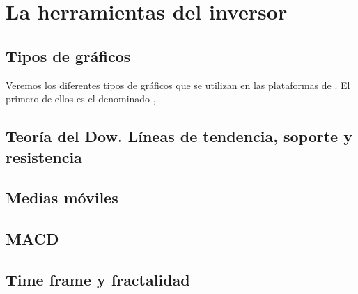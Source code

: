 \chapter{La herramientas del inversor}

\section{Tipos de gráficos}


Veremos los diferentes tipos de gráficos que se utilizan en las plataformas de . El primero de ellos es el denominado , 






\section{Teoría del Dow. Líneas de tendencia, soporte y resistencia}






\section{Medias móviles}

\section{MACD}

\section{Time frame y fractalidad}